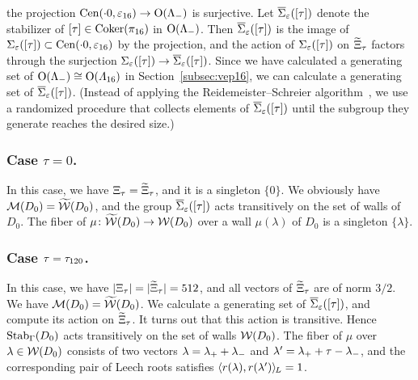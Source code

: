 \documentclass{amsart} %
\begin{document}
the projection
$\mathrm{Cen}(\cdot 0, \varepsilon_{16})\to \mathord{\mathrm{O}}(\Lambda_{-})$ is surjective.
Let $\overline{\Sigma}_{\varepsilon} ([\tau])$ denote the stabilizer of $[\tau]\in \operatorname{Coker}(\pi_{16})$ in $ \mathord{\mathrm{O}}(\Lambda_{-})$.
Then $\overline{\Sigma}_{\varepsilon} ([\tau])$ is the image of $\Sigma_{\varepsilon} ([\tau])\subset \mathrm{Cen}(\cdot 0, \varepsilon_{16})$
by the projection, and 
the action of $\Sigma_{\varepsilon} ([\tau])$
on $\widetilde{\Xi}_{\tau}$ 
factors through the surjection $\Sigma_{\varepsilon} ([\tau])\to\overline{\Sigma}_{\varepsilon} ([\tau])$.
Since we have calculated a generating set of $ \mathord{\mathrm{O}}(\Lambda_{-})\cong \mathord{\mathrm{O}}(\varLambda_{16})$
 in Section~\ref{subsec:vep16},
we can calculate a generating set of $\overline{\Sigma}_{\varepsilon} ([\tau])$.
(Instead of applying the Reidemeister--Schreier algorithm~\cite[Chapter 2]{MR2109550},
we use a randomized procedure that collects elements of $\overline{\Sigma}_{\varepsilon}([\tau])$
until the subgroup they generate reaches the desired size.)
%
\subsubsection{Case $\tau=0$.}
%
In this case,
we have $\Xi_{\tau}=\widetilde{\Xi}_{\tau}$,
and it is a singleton $\{0\}$.
We obviously have $\mathord{\mathcal{M}}(D_0)=\widetilde{\mathord{\mathcal{W}}}(D_0)$,
and the group $\overline{\Sigma}_{\varepsilon} ([\tau])$ acts transitively
on the set of walls of $D_0$.
The fiber of $\mu\colon \widetilde{\mathord{\mathcal{W}}}(D_0)\to\mathord{\mathcal{W}}(D_0)$ 
over a wall $\mu(\lambda)$ of $D_0$ is a singleton $\{\lambda\}$.
%
%
\subsubsection{Case $\tau=\tau_{120}$.}
%
In this case,
we have $|\Xi_{\tau}|=|\widetilde{\Xi}_{\tau}|=512$,
and all vectors of $\widetilde{\Xi}_{\tau}$ are of norm $3/2$.
We have $\mathord{\mathcal{M}}(D_0)=\widetilde{\mathord{\mathcal{W}}}(D_0)$.
We calculate a generating set of $\overline{\Sigma}_{\varepsilon} ([\tau])$,
and compute its action on $\widetilde{\Xi}_{\tau}$.
It turns out that this action is transitive.
Hence $\operatorname{Stab}_{\Gamma}(D_0)$ acts  transitively on the set of walls $\mathord{\mathcal{W}}(D_0)$.
The fiber 
 of $\mu$ over $\lambda\in \mathord{\mathcal{W}}(D_0)$ consists 
of two vectors
$\lambda={\lambda}_{+}+{\lambda}_{-}$ and $\lambda^{\prime}={\lambda}_{+}+\tau-{\lambda}_{-}$, and 
the corresponding pair of Leech roots 
 satisfies
$\langle r(\lambda), r(\lambda^{\prime}) \rangle_{\hskip -1pt L}=1$.
%
\end{document}
